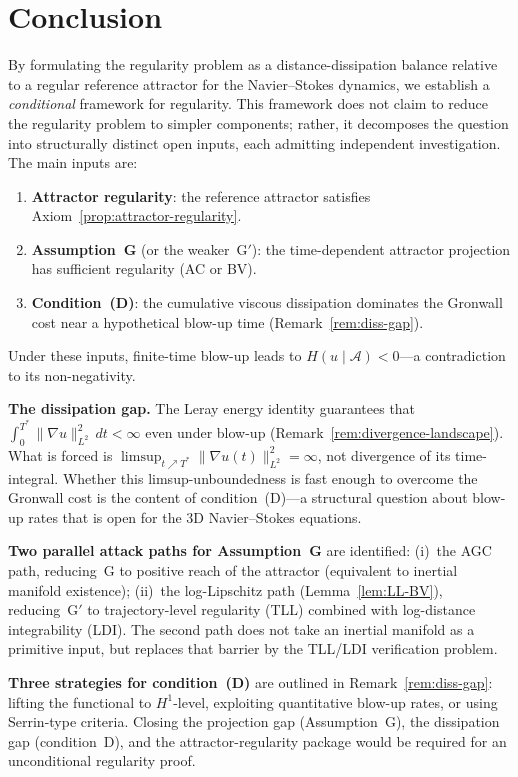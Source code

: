 \documentclass[12pt,a4paper]{article}
\theoremstyle{definition}
\theoremstyle{plain}
\theoremstyle{remark}
\begin{document}
\section{Conclusion}
By formulating the regularity problem as a distance-dissipation balance
relative to a regular reference attractor for the Navier--Stokes dynamics, we
establish a \emph{conditional} framework for regularity.  This
framework does not claim to reduce the regularity problem to simpler
components; rather, it decomposes the question into structurally
distinct open inputs, each admitting independent investigation.
The main inputs are:
\begin{enumerate}
  \item \textbf{Attractor regularity}: the reference attractor satisfies
    Axiom~\ref{prop:attractor-regularity}.
  \item \textbf{Assumption~G} (or the weaker~G$'$): the time-dependent
    attractor projection has sufficient regularity (AC or BV).
  \item \textbf{Condition~(D)}: the cumulative viscous dissipation
    dominates the Gronwall cost near a hypothetical blow-up time
    (Remark~\ref{rem:diss-gap}).
\end{enumerate}
Under these inputs, finite-time blow-up leads to
$H(u \mid \mathcal{A}) < 0$---a contradiction to its non-negativity.

\medskip\noindent
\textbf{The dissipation gap.}\;
The Leray energy identity guarantees that
$\int_0^{T^*}\|\nabla u\|_{L^2}^2\,dt < \infty$ even under blow-up
(Remark~\ref{rem:divergence-landscape}).  What is forced is
$\limsup_{t\nearrow T^*}\|\nabla u(t)\|_{L^2}^2=\infty$,
not divergence of its time-integral.  Whether this limsup-unboundedness is fast
enough to overcome the Gronwall cost is the content of
condition~(D)---a structural question about blow-up rates that is
open for the 3D Navier--Stokes equations.

\medskip\noindent
\textbf{Two parallel attack paths for Assumption~G} are identified:
(i)~the AGC path, reducing~G to positive reach of the attractor
(equivalent to inertial manifold existence);
(ii)~the log-Lipschitz path (Lemma~\ref{lem:LL-BV}), reducing~G$'$ to
trajectory-level regularity (TLL) combined with log-distance
integrability (LDI).  The second path does not take an inertial
manifold as a primitive input, but replaces that barrier by the
TLL/LDI verification problem.

\medskip\noindent
\textbf{Three strategies for condition~(D)} are outlined in
Remark~\ref{rem:diss-gap}: lifting the functional to $H^1$-level,
exploiting quantitative blow-up rates, or using Serrin-type criteria.
Closing the projection gap (Assumption~G), the dissipation gap
(condition~D), and the attractor-regularity package would be required
for an unconditional regularity proof.
\end{document}
